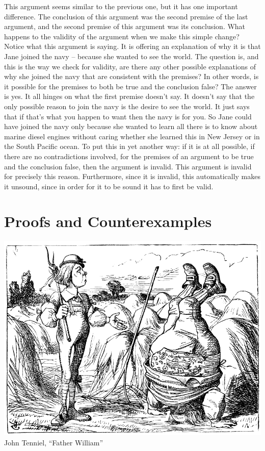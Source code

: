 \documentclass[justified]{tufte-book}
\begin{document}
This argument seems similar to the previous one, but it has one important difference. The conclusion of this argument was the second premise of the last argument, and the second premise of this argument was its conclusion. What happens to the validity of the argument when we make this simple change? Notice what this argument is saying. It is offering an explanation of why it is that Jane joined the navy -- because she wanted to see the world. The question is, and this is the way we check for validity, are there any other possible explanations of why she joined the navy that are consistent with the premises? In other words, is it possible for the premises to both be true and the conclusion false? The answer is yes. It all hinges on what the first premise doesn't say. It doesn't say that the only possible reason to join the navy is the desire to see the world. It just says that if that's what you happen to want then the navy is for you. So Jane could have joined the navy only because she wanted to learn all there is to know about marine diesel engines without caring whether she learned this in New Jersey or in the South Pacific ocean. To put this in yet another way: if it is at all possible, if there are no contradictions involved, for the premises of an argument to be true and the conclusion false, then the argument is invalid. This argument is invalid for precisely this reason. Furthermore, since it is invalid, this automatically makes it unsound, since in order for it to be sound it has to first be valid.

\hypertarget{proofs-and-counterexamples}{%
\section{Proofs and Counterexamples}\label{proofs-and-counterexamples}}

\begin{marginfigure}
\includegraphics{img/tenniel-father-william.png} John Tenniel, ``Father
William''
\end{marginfigure}
\end{document}

